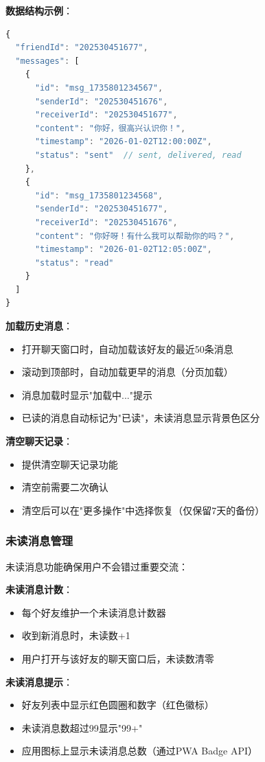 \documentclass[12pt,a4paper]{article}
\begin{document}
\textbf{数据结构示例}：
\begin{lstlisting}[language=JavaScript]
{
  "friendId": "202530451677",
  "messages": [
    {
      "id": "msg_1735801234567",
      "senderId": "202530451676",
      "receiverId": "202530451677",
      "content": "你好，很高兴认识你！",
      "timestamp": "2026-01-02T12:00:00Z",
      "status": "sent"  // sent, delivered, read
    },
    {
      "id": "msg_1735801234568",
      "senderId": "202530451677",
      "receiverId": "202530451676",
      "content": "你好呀！有什么我可以帮助你的吗？",
      "timestamp": "2026-01-02T12:05:00Z",
      "status": "read"
    }
  ]
}
\end{lstlisting}

\textbf{加载历史消息}：
\begin{itemize}
    \item 打开聊天窗口时，自动加载该好友的最近50条消息
    \item 滚动到顶部时，自动加载更早的消息（分页加载）
    \item 消息加载时显示"加载中..."提示
    \item 已读的消息自动标记为"已读"，未读消息显示背景色区分
\end{itemize}

\textbf{清空聊天记录}：
\begin{itemize}
    \item 提供清空聊天记录功能
    \item 清空前需要二次确认
    \item 清空后可以在"更多操作"中选择恢复（仅保留7天的备份）
\end{itemize}

\subsubsection{未读消息管理}

未读消息功能确保用户不会错过重要交流：

\textbf{未读消息计数}：
\begin{itemize}
    \item 每个好友维护一个未读消息计数器
    \item 收到新消息时，未读数+1
    \item 用户打开与该好友的聊天窗口后，未读数清零
\end{itemize}

\textbf{未读消息提示}：
\begin{itemize}
    \item 好友列表中显示红色圆圈和数字（红色徽标）
    \item 未读消息数超过99显示"99+"
    \item 应用图标上显示未读消息总数（通过PWA Badge API）
\end{itemize}
\end{document}
